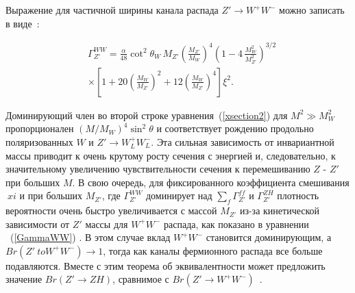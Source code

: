 Выражение для частичной ширины канала распада $ Z '\to W ^ + W ^ - $ можно записать в виде~\cite{2part-pankov}:

\begin{align}
&\Gamma_{Z'}^{WW}=\frac{\alpha}{48}\cot^2\theta_W\, M_{Z'}
\left(\frac{M_{Z'}}{M_W}\right)^4\left(1-4\,\frac{M_W^2}{M_{Z'}^2}\right)^{3/2} \nonumber \\
& \times \left[ 1+20 \left(\frac{M_W}{M_{Z'}}\right)^2 + 12
\left(\frac{M_W}{M_{Z'}}\right)^4\right]\xi^2. \label{GammaWW}
\end{align}

Доминирующий член во второй строке уравнения~(\ref{xsection2}) для $ M ^ 2 \gg M_W ^ 2 $ пропорционален $ (M / M_W) ^ 4 \sin ^ 2 \theta $ и соответствует рождению продольно поляризованных $ W $ и $ Z'\to W^+_LW^-_L $. Эта сильная зависимость от инвариантной массы приводит к очень крутому росту сечения с энергией и, следовательно, к значительному увеличению чувствительности сечения к перемешиванию $ Z $ - $ Z '$ при больших $ M $. В свою очередь, для фиксированного коэффициента смешивания $ \ xi $ и при больших $ M_ {Z '} $, где $ \Gamma_ {Z'} ^ {WW} $ доминирует над $ \sum_f \Gamma_ {Z '} ^ {ff } $ и $ \Gamma_ {Z '} ^ {ZH} $ плотность вероятности очень быстро увеличивается с массой $ M_ {Z'} $ из-за кинетической зависимости от $ Z '$ массы для $ W ^ + W ^ - $ распада, как показано в уравнении ~(\ref{GammaWW})
\cite{2part-pankov}. В этом случае вклад $ W ^ + W ^ - $ становится доминирующим, а $ {Br} (Z '\ to W ^ + W ^ -) \to 1 $, тогда как каналы фермионного распада все больше подавляются. Вместе с этим теорема об эквивалентности может предложить значение $ {Br} (Z'\to ZH) $, сравнимое с $ {Br} (Z' \to W ^ + W ^ -) $~\cite{2part-pankov}.